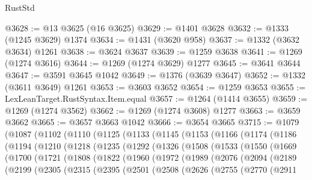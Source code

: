 \begin{lexlean}{RustStd}
\begin{coremodule}
@3628 := @13 @3625 (@16 @3625)
@3629 := @1401 @3628
@3632 := @1333 (@1245 @3629) @1374
@3634 := @1431 (@3620 @958)
@3637 := @1332 (@3632 @3634) @1261
@3638 := @3624 @3637
@3639 := @1259 @3638
@3641 := @1269 (@1274 @3616)
@3644 := @1269 (@1274 @3629) @1277
@3645 := @3641 @3644
@3647 := @3591 @3645 @1042
@3649 := @1376 (@3639 @3647)
@3652 := @1332 (@3611 @3649) @1261
@3653 := @3603 @3652
@3654 := @1259 @3653
@3655 := LexLeanTarget.RustSyntax.Item.equal
@3657 := @1264 (@1414 @3655)
@3659 := @1269 (@1274 @3562)
@3662 := @1269 (@1274 @3608) @1277
@3663 := @3659 @3662
@3665 := @3657 @3663 @1042
@3666 := @3654 @3665
@3715 := @1079
    (@1087
      (@1102
        (@1110
          (@1125
            (@1133
              (@1145
                (@1153
                  (@1166
                    (@1174
                      (@1186
                        (@1194
                          (@1210
                            (@1218
                              (@1235
                                (@1292
                                  (@1326
                                    (@1508
                                      (@1533
                                        (@1550
                                          (@1669
                                            (@1700
                                              (@1721
                                                (@1808
                                                  (@1822
                                                    (@1960
                                                      (@1972
                                                        (@1989
                                                          (@2076
                                                            (@2094
                                                              (@2189
                                                                (@2199
                                                                  (@2305
                                                                    (@2315
                                                                      (@2395
                                                                        (@2501
                                                                          (@2508
                                                                            (@2626
                                                                              (@2755
                                                                                (@2770
                                                                                  (@2911

\end{coremodule}
\end{lexlean}
